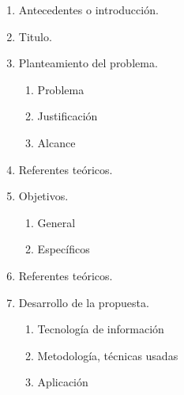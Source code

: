 \documentclass[12pt,a4paper,oneside]{book}
\begin{document}
	
	\begin{enumerate}
		
		\item Antecedentes o introducción.
		
		\item Titulo.  
		
		\item Planteamiento del problema.  
				\begin{enumerate}
					\item Problema
					\item Justificación
					\item Alcance
				\end{enumerate}
		\item Referentes teóricos.  
		
		\item Objetivos.  
				\begin{enumerate}
					\item General
					\item Específicos
				\end{enumerate}
		\item Referentes teóricos.
		  
		\item Desarrollo de la propuesta. 
			\begin{enumerate}
				\item Tecnología de información 
				\item Metodología, técnicas usadas
				\item Aplicación
			\end{enumerate}
			
		  
	\end{enumerate}
	
	
\end{document}
